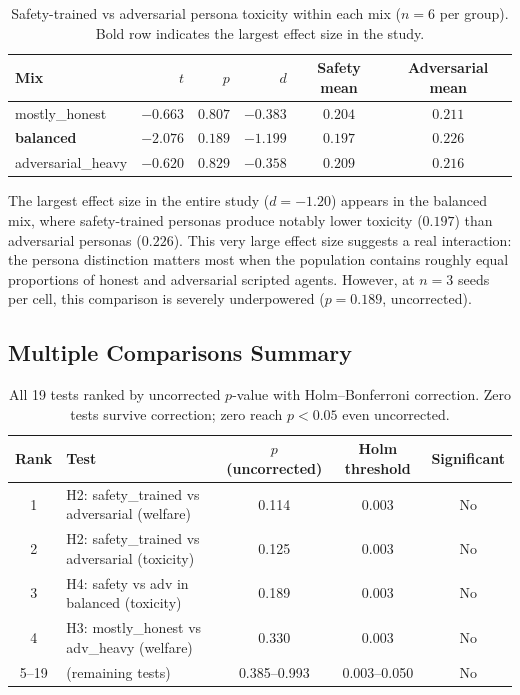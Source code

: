 \documentclass[11pt]{article}
\begin{document}
\begin{table}[H]
\centering
\begin{tabular}{lrrrcc}
\toprule
Mix & $t$ & $p$ & $d$ & Safety mean & Adversarial mean \\
\midrule
mostly\_honest & $-0.663$ & $0.807$ & $-0.383$ & $0.204$ & $0.211$ \\
\textbf{balanced} & $\mathbf{-2.076}$ & $\mathbf{0.189}$ & $\mathbf{-1.199}$ & $\mathbf{0.197}$ & $\mathbf{0.226}$ \\
adversarial\_heavy & $-0.620$ & $0.829$ & $-0.358$ & $0.209$ & $0.216$ \\
\bottomrule
\end{tabular}
\caption{Safety-trained vs adversarial persona toxicity within each mix ($n = 6$ per group). Bold row indicates the largest effect size in the study.}
\label{tab:h4}
\end{table}

The largest effect size in the entire study ($d = -1.20$) appears in the balanced mix, where safety-trained personas produce notably lower toxicity ($0.197$) than adversarial personas ($0.226$). This very large effect size suggests a real interaction: the persona distinction matters most when the population contains roughly equal proportions of honest and adversarial scripted agents. However, at $n = 3$ seeds per cell, this comparison is severely underpowered ($p = 0.189$, uncorrected).

\subsection{Multiple Comparisons Summary}

\begin{table}[H]
\centering
\small
\begin{tabular}{clccc}
\toprule
Rank & Test & $p$ (uncorrected) & Holm threshold & Significant \\
\midrule
1 & H2: safety\_trained vs adversarial (welfare) & 0.114 & 0.003 & No \\
2 & H2: safety\_trained vs adversarial (toxicity) & 0.125 & 0.003 & No \\
3 & H4: safety vs adv in balanced (toxicity) & 0.189 & 0.003 & No \\
4 & H3: mostly\_honest vs adv\_heavy (welfare) & 0.330 & 0.003 & No \\
5--19 & (remaining tests) & 0.385--0.993 & 0.003--0.050 & No \\
\bottomrule
\end{tabular}
\caption{All 19 tests ranked by uncorrected $p$-value with Holm--Bonferroni correction. Zero tests survive correction; zero reach $p < 0.05$ even uncorrected.}
\label{tab:corrections}
\end{table}
\end{document}
